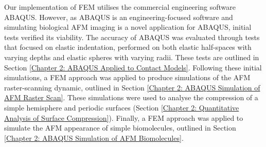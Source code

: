 Our implementation of FEM utilises the commercial engineering software ABAQUS. However, as ABAQUS is an engineering-focused software and simulating biological AFM imaging is a novel application for ABAQUS, initial tests verified its viability. The accuracy of ABAQUS was evaluated through tests that focused on elastic indentation, performed on both elastic half-spaces with varying depths and elastic spheres with varying radii. These tests are outlined in Section \ref{Chapter 2: ABAQUS Applied to Contact Models}. Following these initial simulations, a FEM approach was applied to produce simulations of the AFM raster-scanning dynamic, outlined in Section \ref{Chapter 2: ABAQUS Simulation of AFM Raster Scan}. These simulations were used to analyse the compression of a simple hemisphere and periodic surfaces (Section \ref{Chapter 2: Quantitative Analysis of Surface Compression}). Finally, a FEM approach was applied to simulate the AFM appearance of simple biomolecules, outlined in Section \ref{Chapter 2: ABAQUS Simulation of AFM Biomolecules}. 